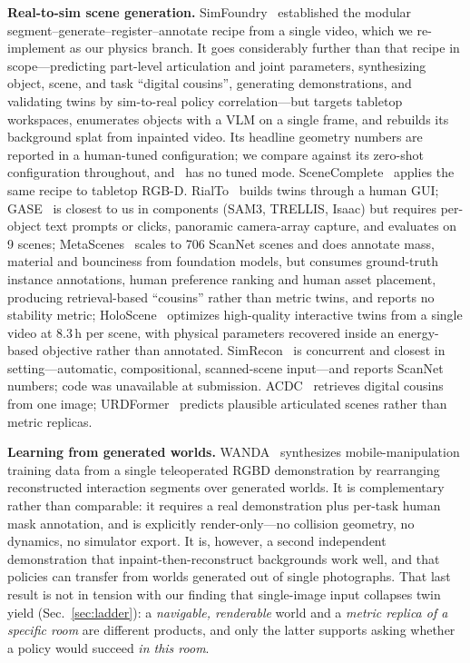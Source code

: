 \textbf{Real-to-sim scene generation.}
SimFoundry~\cite{simfoundry} established the modular
segment--generate--register--annotate recipe from a single video, which we
re-implement as our physics branch. It goes considerably further than
that recipe in scope---predicting part-level articulation and joint
parameters, synthesizing object, scene, and task ``digital cousins'',
generating demonstrations, and validating twins by sim-to-real policy
correlation---but targets tabletop workspaces, enumerates objects with a
VLM on a single frame, and rebuilds its background splat from inpainted
video. Its headline geometry numbers are reported in a human-tuned
configuration; we compare against its zero-shot configuration throughout,
and \name\ has no tuned mode.
SceneComplete~\cite{scenecomplete} applies the same recipe to tabletop
RGB-D. RialTo~\cite{rialto} builds twins through a human GUI;
GASE~\cite{gase} is closest to us in components (SAM3, TRELLIS, Isaac)
but requires per-object text prompts or clicks, panoramic camera-array
capture, and evaluates on 9 scenes; MetaScenes~\cite{metascenes} scales to
706 ScanNet scenes and does annotate mass, material and bounciness from
foundation models, but consumes ground-truth instance annotations, human
preference ranking and human asset placement, producing retrieval-based
``cousins'' rather than metric twins, and reports no stability metric;
HoloScene~\cite{holoscene} optimizes high-quality interactive twins from
a single video at 8.3\,h per scene, with physical parameters recovered
inside an energy-based objective rather than annotated.
SimRecon~\cite{simrecon} is concurrent and closest in setting---automatic,
compositional, scanned-scene input---and reports ScanNet numbers; code
was unavailable at submission. ACDC~\cite{acdc} retrieves digital
cousins from one image; URDFormer~\cite{urdformer} predicts plausible
articulated scenes rather than metric replicas.

\textbf{Learning from generated worlds.}
WANDA~\cite{wanda} synthesizes mobile-manipulation training data from a
single teleoperated RGBD demonstration by rearranging reconstructed
interaction segments over generated worlds. It is complementary rather
than comparable: it requires a real demonstration plus per-task human
mask annotation, and is explicitly render-only---no collision geometry,
no dynamics, no simulator export. It is, however, a second independent
demonstration that inpaint-then-reconstruct backgrounds work well, and
that policies can transfer from worlds generated out of single
photographs. That last result is not in tension with our finding that
single-image input collapses twin yield (Sec.~\ref{sec:ladder}): a
\emph{navigable, renderable} world and a \emph{metric replica of a
specific room} are different products, and only the latter supports
asking whether a policy would succeed \emph{in this room}.


